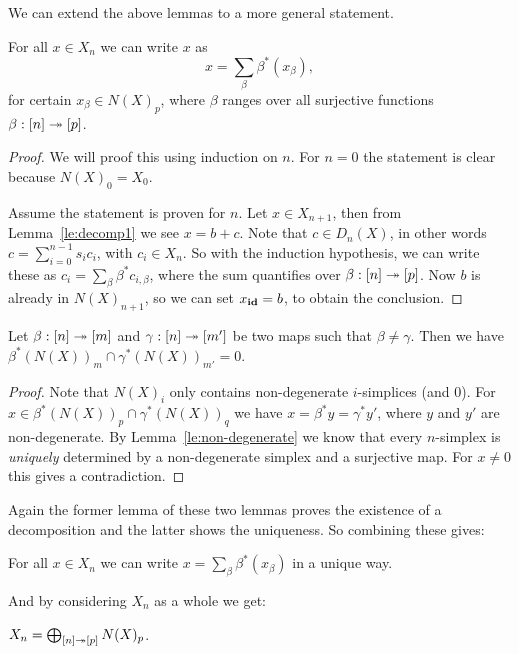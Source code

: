We can extend the above lemmas to a more general statement.

\begin{lemma}
	\label{le:decomp3}
	For all $x \in X_n$ we can write $x$ as
	$$ x = \sum_\beta \beta^\ast (x_\beta), $$
	for certain $x_\beta \in N(X)_p$, where $\beta$ ranges over all surjective functions $\beta : [n] \twoheadrightarrow [p]$.
\end{lemma}
\begin{proof}
	We will proof this using induction on $n$. For $n=0$ the statement is clear because $N(X)_0 = X_0$.

	Assume the statement is proven for $n$. Let $x \in X_{n+1}$, then from Lemma~\ref{le:decomp1} we see $x = b + c$. Note that $c \in D_n(X)$, in other words $c = \sum_{i=0}^{n-1} s_i c_i$, with $c_i \in X_n$. So with the induction hypothesis, we can write these as $c_i = \sum_\beta \beta^\ast c_{i, \beta}$, where the sum quantifies over $\beta: [n] \twoheadrightarrow [p]$. Now $b$ is already in $N(X)_{n+1}$, so we can set $x_{\mathbf{id}} = b$, to obtain the conclusion.
\end{proof}
\begin{lemma}
	\label{le:decomp4}
	Let $\beta: [n] \twoheadrightarrow [m]$ and $\gamma : [n] \twoheadrightarrow [m']$ be two maps such that $\beta \neq \gamma$. Then we have $\beta^\ast(N(X))_m \cap \gamma^\ast(N(X))_{m'} = 0$.
\end{lemma}
\begin{proof}
	Note that $N(X)_i$ only contains non-degenerate $i$-simplices (and $0$). For $x \in \beta^\ast(N(X))_p \cap \gamma^\ast(N(X))_q$ we have $x = \beta^\ast y = \gamma^\ast y'$, where $y$ and $y'$ are non-degenerate. By Lemma~\ref{le:non-degenerate} we know that every $n$-simplex is \emph{uniquely} determined by a non-degenerate simplex and a surjective map. For $x \neq 0$ this gives a contradiction.
\end{proof}

Again the former lemma of these two lemmas proves the existence of a decomposition and the latter shows the uniqueness. So combining these gives:

\begin{corollary}
	\label{cor:decomp}
	For all $x \in X_n$ we can write $x = \sum_\beta \beta^\ast (x_\beta)$ in a unique way.
\end{corollary}

And by considering $X_n$ as a whole we get:

\begin{corollary}
	\label{cor:nondegN}
	$X_n = \bigoplus_{[n] \twoheadrightarrow [p]} N(X)_p$.
\end{corollary}

